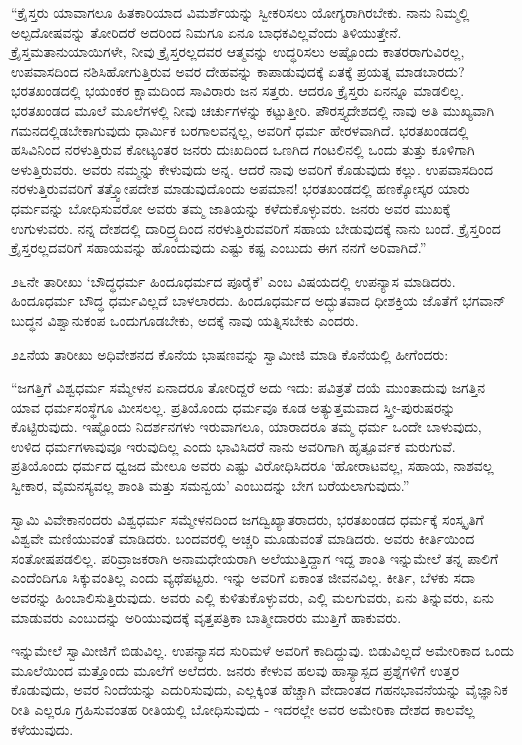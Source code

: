  “ಕ್ರೈಸ್ತರು ಯಾವಾಗಲೂ ಹಿತಕಾರಿಯಾದ ವಿಮರ್ಶೆಯನ್ನು ಸ್ವೀಕರಿಸಲು ಯೋಗ್ಯರಾಗಿರಬೇಕು. ನಾನು ನಿಮ್ಮಲ್ಲಿ ಅಲ್ಪದೋಷವನ್ನು ತೋರಿದರೆ ಅದರಿಂದ ನಿಮಗೂ ಏನೂ ಬಾಧಕವಿಲ್ಲವೆಂದು ತಿಳಿಯುತ್ತೇನೆ. ಕ್ರೈಸ್ತಮತಾನುಯಾಯಿಗಳೇ, ನೀವು ಕ್ರೈಸ್ತರಲ್ಲದವರ ಆತ್ಮವನ್ನು ಉದ್ಧರಿಸಲು ಅಷ್ಟೊಂದು ಕಾತರರಾಗುವಿರಲ್ಲ, ಉಪವಾಸದಿಂದ ನಶಿಸಿಹೋಗುತ್ತಿರುವ ಅವರ ದೇಹವನ್ನು ಕಾಪಾಡುವುದಕ್ಕೆ ಏತಕ್ಕೆ ಪ್ರಯತ್ನ ಮಾಡಬಾರದು? ಭರತಖಂಡದಲ್ಲಿ ಭಯಂಕರ ಕ್ಷಾಮದಿಂದ ಸಾವಿರಾರು ಜನ ಸತ್ತರು. ಆದರೂ ಕ್ರೈಸ್ತರು ಏನನ್ನೂ ಮಾಡಲಿಲ್ಲ. ಭರತಖಂಡದ ಮೂಲೆ ಮೂಲೆಗಳಲ್ಲಿ ನೀವು ಚರ್ಚುಗಳನ್ನು ಕಟ್ಟುತ್ತೀರಿ. ಪೌರಸ್ತ್ಯದೇಶದಲ್ಲಿ ನಾವು ಅತಿ ಮುಖ್ಯವಾಗಿ ಗಮನದಲ್ಲಿಡಬೇಕಾಗುವುದು ಧಾರ್ಮಿಕ ಬರಗಾಲವನ್ನಲ್ಲ, ಅವರಿಗೆ ಧರ್ಮ ಹೇರಳವಾಗಿದೆ. ಭರತಖಂಡದಲ್ಲಿ ಹಸಿವಿನಿಂದ ನರಳುತ್ತಿರುವ ಕೋಟ್ಯಂತರ ಜನರು ದುಃಖದಿಂದ ಒಣಗಿದ ಗಂಟಲಿನಲ್ಲಿ ಒಂದು ತುತ್ತು ಕೂಳಿಗಾಗಿ ಅಳುತ್ತಿರುವರು. ಅವರು ನಮ್ಮನ್ನು ಕೇಳುವುದು ಅನ್ನ. ಆದರೆ ನಾವು ಅವರಿಗೆ ಕೊಡುವುದು ಕಲ್ಲು. ಉಪವಾಸದಿಂದ ನರಳುತ್ತಿರುವವರಿಗೆ ತತ್ತ್ವೋಪದೇಶ ಮಾಡುವುದೊಂದು ಅಪಮಾನ! ಭರತಖಂಡದಲ್ಲಿ ಹಣಕ್ಕೋಸ್ಕರ ಯಾರು ಧರ್ಮವನ್ನು ಬೋಧಿಸುವರೋ ಅವರು ತಮ್ಮ ಜಾತಿಯನ್ನು ಕಳೆದುಕೊಳ್ಳುವರು. ಜನರು ಅವರ ಮುಖಕ್ಕೆ ಉಗುಳುವರು. ನನ್ನ ದೇಶದಲ್ಲಿ ದಾರಿದ್ರ್ಯದಿಂದ ನರಳುತ್ತಿರುವವರಿಗೆ ಸಹಾಯ ಬೇಡುವುದಕ್ಕೆ ನಾನು ಬಂದೆ. ಕ್ರೈಸ್ತರಿಂದ ಕ್ರೈಸ್ತರಲ್ಲದವರಿಗೆ ಸಹಾಯವನ್ನು ಹೊಂದುವುದು ಎಷ್ಟು ಕಷ್ಟ ಎಂಬುದು ಈಗ ನನಗೆ ಅರಿವಾಗಿದೆ.” 

 ೨೬ನೇ ತಾರೀಖು ‘ಬೌದ್ಧಧರ್ಮ ಹಿಂದೂಧರ್ಮದ ಪೂರೈಕೆ’ ಎಂಬ ವಿಷಯದಲ್ಲಿ ಉಪನ್ಯಾಸ ಮಾಡಿದರು. ಹಿಂದೂಧರ್ಮ ಬೌದ್ಧ ಧರ್ಮವಿಲ್ಲದೆ ಬಾಳಲಾರದು. ಹಿಂದೂಧರ್ಮದ ಅದ್ಭುತವಾದ ಧೀಶಕ್ತಿಯ ಜೊತೆಗೆ ಭಗವಾನ್ ಬುದ್ಧನ ವಿಶ್ವಾನುಕಂಪ ಒಂದುಗೂಡಬೇಕು, ಅದಕ್ಕೆ ನಾವು ಯತ್ನಿಸಬೇಕು ಎಂದರು. 

 ೨೭ನೆಯ ತಾರೀಖು ಅಧಿವೇಶನದ ಕೊನೆಯ ಭಾಷಣವನ್ನು ಸ್ವಾಮೀಜಿ ಮಾಡಿ ಕೊನೆಯಲ್ಲಿ ಹೀಗೆಂದರು: 

 “ಜಗತ್ತಿಗೆ ವಿಶ್ವಧರ್ಮ ಸಮ್ಮೇಳನ ಏನಾದರೂ ತೋರಿದ್ದರೆ ಅದು ಇದು: ಪವಿತ್ರತೆ ದಯೆ ಮುಂತಾದುವು ಜಗತ್ತಿನ ಯಾವ ಧರ್ಮಸಂಸ್ಥೆಗೂ ಮೀಸಲಲ್ಲ. ಪ್ರತಿಯೊಂದು ಧರ್ಮವೂ ಕೂಡ ಅತ್ಯುತ್ತಮವಾದ ಸ್ತ್ರೀ-ಪುರುಷರನ್ನು ಕೊಟ್ಟಿರುವುದು. ಇಷ್ಟೊಂದು ನಿದರ್ಶನಗಳು ಇರುವಾಗಲೂ, ಯಾರಾದರೂ ತಮ್ಮ ಧರ್ಮ ಒಂದೇ ಬಾಳುವುದು, ಉಳಿದ ಧರ್ಮಗಳಾವುವೂ ಇರುವುದಿಲ್ಲ ಎಂದು ಭಾವಿಸಿದರೆ ನಾನು ಅವರಿಗಾಗಿ ಹೃತ್ಪೂರ್ವಕ ಮರುಗುವೆ. ಪ್ರತಿಯೊಂದು ಧರ್ಮದ ಧ್ವಜದ ಮೇಲೂ ಅವರು ಎಷ್ಟು ವಿರೋಧಿಸಿದರೂ ‘ಹೋರಾಟವಲ್ಲ, ಸಹಾಯ, ನಾಶವಲ್ಲ ಸ್ವೀಕಾರ, ವೈಮನಸ್ಯವಲ್ಲ ಶಾಂತಿ ಮತ್ತು ಸಮನ್ವಯ’ ಎಂಬುದನ್ನು ಬೇಗ ಬರೆಯಲಾಗುವುದು.” 

 ಸ್ವಾಮಿ ವಿವೇಕಾನಂದರು ವಿಶ್ವಧರ್ಮ ಸಮ್ಮೇಳನದಿಂದ ಜಗದ್ವಿಖ್ಯಾತರಾದರು, ಭರತಖಂಡದ ಧರ್ಮಕ್ಕೆ ಸಂಸ್ಕೃತಿಗೆ ವಿಶ್ವವೇ ಮಣಿಯುವಂತೆ ಮಾಡಿದರು. ಬಂದವರಲ್ಲಿ ಅಚ್ಚರಿ ಮೂಡುವಂತೆ ಮಾಡಿದರು. ಅವರು ಕೀರ್ತಿಯಿಂದ ಸಂತೋಷಪಡಲಿಲ್ಲ. ಪರಿವ್ರಾಜಕರಾಗಿ ಅನಾಮಧೇಯರಾಗಿ ಅಲೆಯುತ್ತಿದ್ದಾಗ ಇದ್ದ ಶಾಂತಿ ಇನ್ನುಮೇಲೆ ತನ್ನ ಪಾಲಿಗೆ ಎಂದೆಂದಿಗೂ ಸಿಕ್ಕುವಂತಿಲ್ಲ ಎಂದು ವ್ಯಥೆಪಟ್ಟರು. ಇನ್ನು ಅವರಿಗೆ ಏಕಾಂತ ಜೀವನವಿಲ್ಲ. ಕೀರ್ತಿ, ಬೆಳಕು ಸದಾ ಅವರನ್ನು ಹಿಂಬಾಲಿಸುತ್ತಿರುವುದು. ಅವರು ಎಲ್ಲಿ ಕುಳಿತುಕೊಳ್ಳುವರು, ಎಲ್ಲಿ ಮಲಗುವರು, ಏನು ತಿನ್ನುವರು, ಏನು ಮಾಡುವರು ಎಂಬುದನ್ನು ಅರಿಯುವುದಕ್ಕೆ ವೃತ್ತಪತ್ರಿಕಾ ಬಾತ್ಮೀದಾರರು ಮುತ್ತಿಗೆ ಹಾಕುವರು. 

 ಇನ್ನುಮೇಲೆ ಸ್ವಾಮೀಜಿಗೆ ಬಿಡುವಿಲ್ಲ. ಉಪನ್ಯಾಸದ ಸುರಿಮಳೆ ಅವರಿಗೆ ಕಾದಿದ್ದುವು. ಬಿಡುವಿಲ್ಲದೆ ಅಮೇರಿಕಾದ ಒಂದು ಮೂಲೆಯಿಂದ ಮತ್ತೊಂದು ಮೂಲೆಗೆ ಅಲೆದರು. ಜನರು ಕೇಳುವ ಹಲವು ಹಾಸ್ಯಾಸ್ಪದ ಪ್ರಶ್ನೆಗಳಿಗೆ ಉತ್ತರ ಕೊಡುವುದು, ಅವರ ನಿಂದೆಯನ್ನು ಎದುರಿಸುವುದು, ಎಲ್ಲಕ್ಕಿಂತ ಹೆಚ್ಚಾಗಿ ವೇದಾಂತದ ಗಹನಭಾವನೆಯನ್ನು ವೈಜ್ಞಾನಿಕ ರೀತಿ ಎಲ್ಲರೂ ಗ್ರಹಿಸುವಂತಹ ರೀತಿಯಲ್ಲಿ ಬೋಧಿಸುವುದು - ಇದರಲ್ಲೇ ಅವರ ಅಮೇರಿಕಾ ದೇಶದ ಕಾಲವೆಲ್ಲ ಕಳೆಯುವುದು. 

